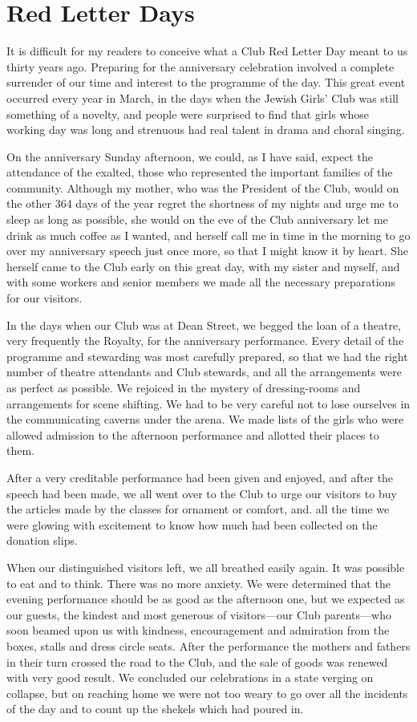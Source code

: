 \chapter{Red Letter Days}

It is difficult for my readers to conceive what a Club Red
Letter Day meant to us thirty years ago. Preparing for
the anniversary celebration involved a complete surrender
of our time and interest to the programme of the
day. This great event occurred every year in March,
in the days when the Jewish Girls’ Club was still something
of a novelty, and people were surprised to find that
girls whose working day was long and strenuous had real
talent in drama and choral singing.

On the anniversary Sunday afternoon, we could, as I
have said, expect the attendance of the exalted, those who
represented the important families of the community.
Although my mother, who was the President of the Club,
would on the other 364 days of the year regret the shortness
of my nights and urge me to sleep as long as possible,
she would on the eve of the Club anniversary let me drink
as much coffee as I wanted, and herself call me in time
in the morning to go over my anniversary speech just
once more, so that I might know it by heart. She herself
came to the Club early on this great day, with my sister
and myself, and with some workers and senior members
we made all the necessary preparations for our visitors.

In the days when our Club was at Dean Street, we
begged the loan of a theatre, very frequently the Royalty,
for the anniversary performance. Every detail of the programme
and stewarding was most carefully prepared, so
that we had the right number of theatre attendants and
Club stewards, and all the arrangements were as perfect
as possible. We rejoiced in the mystery of dressing-rooms
and arrangements for scene shifting. We had to be very
careful not to lose ourselves in the communicating
caverns under the arena. We made lists of the girls who
were allowed admission to the afternoon performance and
allotted their places to them.

After a very creditable performance had been given
and enjoyed, and after the speech had been made, we all
went over to the Club to urge our visitors to buy the
articles made by the classes for ornament or comfort, and.
all the time we were glowing with excitement to know
how much had been collected on the donation slips.

When our distinguished visitors left, we all breathed
easily again. It was possible to eat and to think. There
was no more anxiety. We were determined that the evening
performance should be as good as the afternoon one,
but we expected as our guests, the kindest and most
generous of visitors—our Club parents—who soon beamed
upon us with kindness, encouragement and admiration
from the boxes, stalls and dress circle seats. After the performance
the mothers and fathers in their turn crossed
the road to the Club, and the sale of goods was renewed
with very good result. We concluded our celebrations in a
state verging on collapse, but on reaching home we were
not too weary to go over all the incidents of the day and
to count up the shekels which had poured in.

